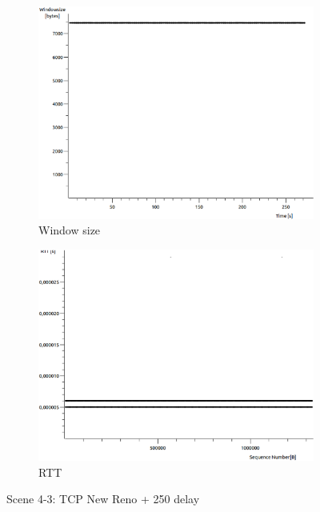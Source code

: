 \documentclass[conference,a4paper]{../../sty/IEEEtran}
\begin{document}
\begin{figure}
\begin{subfigure}[b]{0.2\textwidth}
  \includegraphics[width=\textwidth]{s4-3_wnd}
  \caption{Window size}
 \end{subfigure}
 \begin{subfigure}[b]{0.2\textwidth}
  \includegraphics[width=\textwidth]{s4-3_rtt}
  \caption{RTT}
 \end{subfigure}
 \caption{Scene 4-3: TCP New Reno + 250 delay}
\end{figure}
\end{document}
